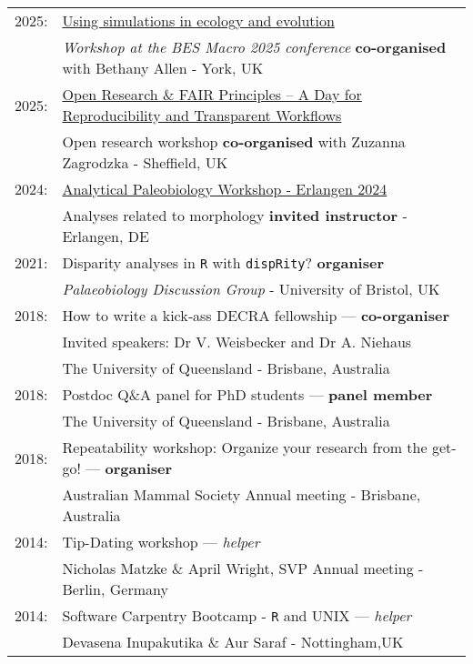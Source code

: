 \documentclass[10pt,a4paper]{article}
\begin{document}
{\begin{tabular}{ll}
2025: & \href{}{Using simulations in ecology and evolution}\\
      & \textit{Workshop at the BES Macro 2025 conference} \textbf{co-organised} with Bethany Allen - York, UK\\
2025: & \href{}{Open Research \& FAIR Principles – A Day for Reproducibility and Transparent Workflows}\\
      & Open research workshop \textbf{co-organised} with Zuzanna Zagrodzka - Sheffield, UK\\
2024: & \href{https://fau-paleo.github.io/apw_2024/}{Analytical Paleobiology Workshop - Erlangen 2024}\\
      & Analyses related to morphology \textbf{invited instructor} - Erlangen, DE\\
2021: & Disparity analyses in \texttt{R} with \texttt{dispRity}? \textbf{organiser}\\
      & \textit{Palaeobiology Discussion Group} - University of Bristol, UK\\
2018: & How to write a kick‐ass DECRA fellowship --- \textbf{co-organiser}\\
      & Invited speakers: Dr V. Weisbecker and Dr A. Niehaus\\
      & The University of Queensland - Brisbane, Australia\\
2018: & Postdoc Q\&A panel for PhD students --- \textbf{panel member}\\
      & The University of Queensland - Brisbane, Australia\\
2018: & Repeatability workshop: Organize your research from the get-go! --- \textbf{organiser}\\
      & Australian Mammal Society Annual meeting - Brisbane, Australia\\
2014: & Tip-Dating workshop --- \textit{helper}\\
      & Nicholas Matzke \& April Wright, SVP Annual meeting - Berlin, Germany\\
2014: & Software Carpentry Bootcamp - \texttt{R} and UNIX --- \textit{helper}\\
      & Devasena Inupakutika \& Aur Saraf - Nottingham,UK\\
\end{tabular}

}
\end{document}
